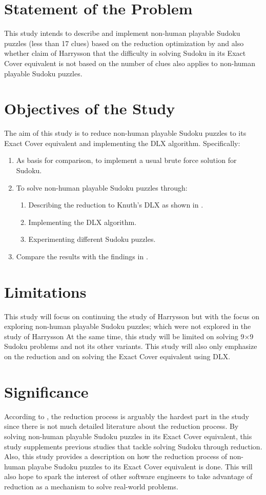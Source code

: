 \documentclass[a4paper,oneside,11pt]{report}
\begin{document}
\section{Statement of the Problem}
This study intends to describe and implement non-human playable Sudoku puzzles (less than 17 clues) based on the reduction optimization by \cite{Harrysson} and also whether claim of Harrysson that the difficulty in solving Sudoku in its Exact Cover equivalent is not based on the number of clues also applies to non-human playable Sudoku puzzles.

\section{Objectives of the Study}
The aim of this study is to reduce non-human playable Sudoku puzzles to its Exact Cover equivalent and implementing the DLX algorithm. Specifically:
\begin{enumerate}
\item As basis for comparison, to implement a usual brute force solution for Sudoku.
\item To solve non-human playable Sudoku puzzles through:
\begin{enumerate}
\item Describing the reduction to Knuth$’$s DLX as shown in \cite{Harrysson}.
\item Implementing the DLX algorithm.
\item Experimenting different Sudoku puzzles.
\end{enumerate}
\item Compare the results with the findings in \cite{Harrysson}.
\end{enumerate}

\section{Limitations}
This study will focus on continuing the study of Harrysson but with the focus on exploring non-human playable Sudoku puzzles; which were not explored in the study of Harrysson At the same time, this study will be limited on solving 9$\times$9 Sudoku problems and not its other variants. This study will also only emphasize on the reduction and on solving the Exact Cover equivalent using DLX.

\section{Significance}
According to \cite{Harrysson}, the reduction process is arguably the hardest part in the study since there is not much detailed literature about the reduction process. By solving non-human playable Sudoku puzzles in its Exact Cover equivalent, this study supplements previous studies that tackle solving Sudoku through reduction. Also, this study provides a description on how the reduction process  of non-human playabe Sudoku puzzles to its Exact Cover equivalent is done. This will also hope to spark the interest of other software engineers to take advantage of reduction as a mechanism to solve real-world problems.
\end{document}
